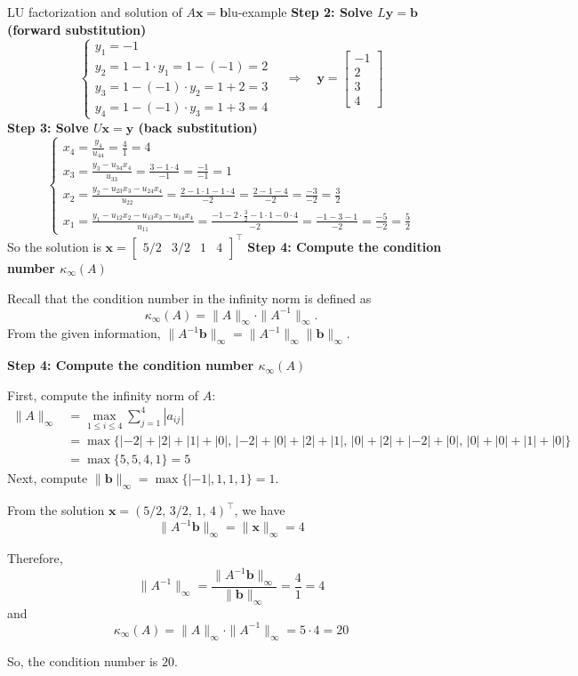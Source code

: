 \begin{example}{LU factorization and solution of $A\mathbf{x} = \mathbf{b}$}{lu-example}
\textbf{Step 2: Solve $L\mathbf{y} = \mathbf{b}$ (forward substitution)}
\[
\begin{cases}
y_1 = -1 \\
y_2 = 1 - 1 \cdot y_1 = 1 - (-1) = 2 \\
y_3 = 1 - (-1) \cdot y_2 = 1 + 2 = 3 \\
y_4 = 1 - (-1) \cdot y_3 = 1 + 3 = 4
\end{cases}
\quad
\Rightarrow
\quad
\mathbf{y} = \begin{bmatrix} -1 \\ 2 \\ 3 \\ 4 \end{bmatrix}
\]
\textbf{Step 3: Solve $U\mathbf{x} = \mathbf{y}$ (back substitution)}
\[
\begin{cases}
x_4 = \frac{y_4}{u_{44}} = \frac{4}{1} = 4 \\
x_3 = \frac{y_3 - u_{34} x_4}{u_{33}} = \frac{3 - 1 \cdot 4}{-1} = \frac{-1}{-1} = 1 \\
x_2 = \frac{y_2 - u_{23} x_3 - u_{24} x_4}{u_{22}} = \frac{2 - 1 \cdot 1 - 1 \cdot 4}{-2} = \frac{2 - 1 - 4}{-2} = \frac{-3}{-2} = \frac{3}{2} \\
x_1 = \frac{y_1 - u_{12} x_2 - u_{13} x_3 - u_{14} x_4}{u_{11}} = \frac{-1 - 2 \cdot \frac{3}{2} - 1 \cdot 1 - 0 \cdot 4}{-2} = \frac{-1 - 3 - 1}{-2} = \frac{-5}{-2} = \frac{5}{2}
\end{cases}
\]
So the solution is \(\mathbf{x} = \begin{bmatrix}5/2 & 3/2 & 1 & 4\end{bmatrix}^\top\)
\textbf{Step 4: Compute the condition number $\kappa_\infty(A)$}

Recall that the condition number in the infinity norm is defined as
\[
    \kappa_\infty(A) = \|A\|_\infty \cdot \|A^{-1}\|_\infty.
\]
From the given information, $\|A^{-1} \mathbf{b}\|_\infty = \|A^{-1}\|_\infty \|\mathbf{b}\|_\infty$.

\textbf{Step 4: Compute the condition number $\kappa_\infty(A)$}

First, compute the infinity norm of $A$:
\begin{align*}
\|A\|_\infty &= \max_{1 \leq i \leq 4} \sum_{j=1}^4 |a_{ij}|\\
&= \max\{ |{-2}|+|2|+|1|+|0|,\, |{-2}|+|0|+|2|+|1|,\, |0|+|2|+|{-2}|+|0|,\, |0|+|0|+|1|+|0| \}\\
&= \max\{5, 5, 4, 1\} = 5
\end{align*}
Next, compute $\|\mathbf{b}\|_\infty = \max\{|-1|, 1, 1, 1\} = 1$.

From the solution $\mathbf{x} = (5/2,\, 3/2,\, 1,\, 4)^\top$, we have
\[
\|A^{-1} \mathbf{b}\|_\infty = \|\mathbf{x}\|_\infty = 4
\]

Therefore,
\[
\|A^{-1}\|_\infty = \frac{\|A^{-1} \mathbf{b}\|_\infty}{\|\mathbf{b}\|_\infty} = \frac{4}{1} = 4
\]
and
\[
\kappa_\infty(A) = \|A\|_\infty \cdot \|A^{-1}\|_\infty = 5 \cdot 4 = 20
\]

So, the condition number is $\boxed{20}$.
\end{example}

